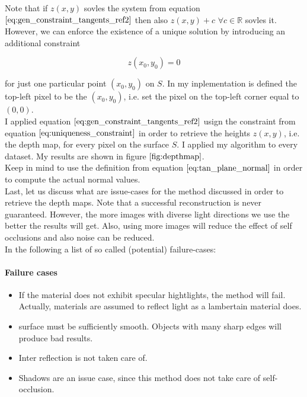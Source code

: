 \documentclass{paper}
\begin{document}
Note that if $z(x,y)$ sovles the system from equation $\ref{eq:gen_constraint_tangents_ref2}$ then also $z(x,y) + c$ $\forall c \in \mathbb{R}$ sovles it. However, we can enforce the existence of a unique solution by introducing an additional constraint

\begin{equation}
    z(x_0, y_0) = 0 
\label{eq:uniqueness_constraint}
\end{equation}

for just one particular point $(x_0, y_0)$ on $S$. In my inplementation is defined the top-left pixel to be the $(x_0, y_0)$, i.e. set the pixel on the top-left corner equal to $(0,0)$. \\

I applied equation $\ref{eq:gen_constraint_tangents_ref2}$ usign the constraint from equation $\ref{eq:uniqueness_constraint}$ in order to retrieve the heights $z(x,y)$, i.e. the depth map, for every pixel on the surface $S$. I applied my algorithm to every dataset. My results are shown in figure $\ref{fig:depthmap}$. \\

Keep in mind to use the definition from equation $\ref{eq:tan_plane_normal}$ in order to compute the actual normal values. \\

Last, let us discuss what are issue-cases for the method discussed in order to retrieve the depth maps. Note that a successful reconstruction is never guaranteed. However, the more images with diverse light directions we use the better the results will get. Also, using more images will reduce the effect of self occlusions and also noise can be reduced. \\

In the following a list of so called (potential) failure-cases:
    
\paragraph{Failure cases}
\begin{itemize}
    \item If the material does not exhibit specular hightlights, the method will fail. Actually, materials are assumed to reflect light as a lambertain material does.
    \item surface must be sufficiently smooth. Objects with many sharp edges will produce bad results.
    \item Inter reflection is not taken care of.
    \item Shadows are an issue case, since this method does not take care of self-occlusion.
\end{itemize}
\end{document}
